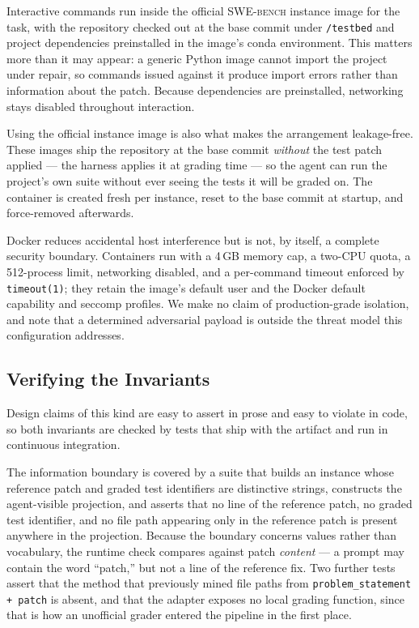 \documentclass[journal]{IEEEtran}
\newcommand{\swebench}{\textsc{SWE-bench}}
\begin{document}
Interactive commands run inside the official \swebench{} instance image for the task, with the repository checked out at the base commit under \texttt{/testbed} and project dependencies preinstalled in the image's conda environment. This matters more than it may appear: a generic Python image cannot import the project under repair, so commands issued against it produce import errors rather than information about the patch. Because dependencies are preinstalled, networking stays disabled throughout interaction.

Using the official instance image is also what makes the arrangement leakage-free. These images ship the repository at the base commit \emph{without} the test patch applied — the harness applies it at grading time — so the agent can run the project's own suite without ever seeing the tests it will be graded on. The container is created fresh per instance, reset to the base commit at startup, and force-removed afterwards.

Docker reduces accidental host interference but is not, by itself, a complete security boundary. Containers run with a 4\,GB memory cap, a two-CPU quota, a 512-process limit, networking disabled, and a per-command timeout enforced by \texttt{timeout(1)}; they retain the image's default user and the Docker default capability and seccomp profiles. We make no claim of production-grade isolation, and note that a determined adversarial payload is outside the threat model this configuration addresses.

\subsection{Verifying the Invariants}
\label{sec:verification}

Design claims of this kind are easy to assert in prose and easy to violate in code, so both invariants are checked by tests that ship with the artifact and run in continuous integration.

The information boundary is covered by a suite that builds an instance whose reference patch and graded test identifiers are distinctive strings, constructs the agent-visible projection, and asserts that no line of the reference patch, no graded test identifier, and no file path appearing only in the reference patch is present anywhere in the projection. Because the boundary concerns values rather than vocabulary, the runtime check compares against patch \emph{content} — a prompt may contain the word ``patch,'' but not a line of the reference fix. Two further tests assert that the method that previously mined file paths from \texttt{problem\_statement + patch} is absent, and that the adapter exposes no local grading function, since that is how an unofficial grader entered the pipeline in the first place.
\end{document}
